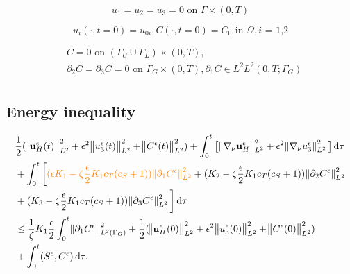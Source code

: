 \documentclass[11pt]{article}
\newcommand*\diff{\mathop{}\!\mathrm{d}}
\begin{document}
    \begin{equation} \label{HNSC6}   
    u_1 = u_2 = u_3 = 0 \text{ on } \Gamma \times (0,T)
    \end{equation}
    
    \begin{equation} \label{HNSC7}   
    u_i (\cdot, t=0) = u_{0 i}, C (\cdot, t=0) = C_0 \text{ in } \Omega, \text{$i$ = 1,2}
    \end{equation}
    
    \begin{equation} \label{HNSC8}
      \begin{split}
        &C = 0 \text{ on } ( \Gamma_U \cup \Gamma_L) \times (0,T), \\
        & \partial_2 C = \partial_3 C = 0 \text{ on } \Gamma_G \times (0,T), \partial_1 C \in L^2 L^2 (0,T; \Gamma_G) \\
      \end{split}
    \end{equation}
    
\subsection{Energy inequality}

  \begin{equation}\nonumber
    \begin{split}  
    & \frac{1}{2} (\norm{\mathbf{u}_H^\epsilon (t)}_{L^2}^2 + \epsilon ^ 2 \norm{u_3^\epsilon (t)}_{L^2}^2 + \norm{C^\epsilon (t)}_{L^2}^2) + \int_0 ^ t \big [\norm{\nabla_\nu \mathbf{u}_H^\epsilon}_{L^2}^2 + \epsilon ^ 2 \norm{\nabla_\nu u_3^\epsilon}_{L^2}^2 \big ] \diff \tau \\
    & + \int_0 ^ t \bigg[ \textcolor{orange}{ (\epsilon K_1 - \zeta \frac{\epsilon}{2} K_1 c_T (c_S + 1)) \norm{\partial_1 C^\epsilon}_{L^2}^2}  + (K_2 - \zeta \frac{\epsilon}{2} K_1 c_T (c_S + 1)) \norm{\partial_2 C^\epsilon}_{L^2}^2 \\
    & + (K_3 - \zeta \frac{\epsilon}{2} K_1 c_T (c_S + 1)) \norm{\partial_3 C^\epsilon}_{L^2}^2 \bigg] \diff \tau \\
    & \leq \frac{1}{\zeta} K_1 \frac{\epsilon}{2} \int_0 ^ t \norm{\partial_1 C^\epsilon}^2 _{L^2 (\Gamma_G)} + \frac{1}{2} (\norm{\mathbf{u}_H^\epsilon (0)}_{L^2}^2 + \epsilon ^ 2 \norm{u_3^\epsilon (0)}_{L^2}^2 + \norm{C^\epsilon (0)}_{L^2}^2) \\
    & + \int_0^t (S^\epsilon,C^\epsilon) \diff \tau.
    \end{split}
  \end{equation} 
\end{document}
